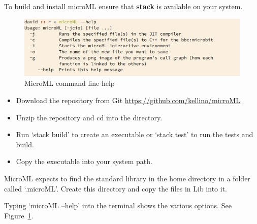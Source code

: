 To build and install microML ensure that \textbf{stack} is available on your system. 

\begin{figure}
    \label{fig:help}
    \includegraphics[width=\textwidth]{images/help.jpg}
    {\caption{MicroML command line help}}
\end{figure}

\begin{itemize}
    \item Download the repository from Git \url{https://github.com/kellino/microML}
    \item Unzip the repository and cd into the directory.
    \item Run `stack build' to create an executable or `stack test' to run the tests and build.
    \item Copy the executable into your system path.
\end{itemize}

MicroML expects to find the standard library in the home directory in a folder called `.microML'.
Create this directory and copy the files in Lib into it.

Typing `microML --help' into the terminal shows the various options. See Figure~\ref{fig:help}.


